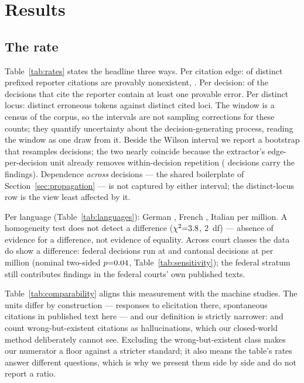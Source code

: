 \documentclass[11pt,a4paper]{article}
\begin{document}
\section{Results}\label{sec:results}

\subsection{The rate}\label{sec:rate}

Table~\ref{tab:rates} states the headline three ways. Per citation
edge: \NFindings{} of \NDenomTokens{} distinct prefixed reporter
citations are provably nonexistent, \RatePpm{}. Per decision:
\DecShare{} of the \NDecTok{} decisions that cite the reporter contain
at least one provable error. Per distinct locus: \NDistinctTokens{}
distinct erroneous tokens against \NDistinctRefs{} distinct cited
loci. The window is a census of the corpus, so the intervals are not
sampling corrections for these counts; they quantify uncertainty about
the decision-generating process, reading the window as one draw from
it. Beside the Wilson interval we report a bootstrap that resamples
decisions; the two nearly coincide because the extractor's
edge-per-decision unit already removes within-decision repetition
(\NDecFind{} decisions carry the \NFindings{} findings). Dependence
\emph{across} decisions --- the shared boilerplate of
Section~\ref{sec:propagation} --- is not captured by either interval;
the distinct-locus row is the view least affected by it.



Per language (Table~\ref{tab:languages}): German \RateDe{}, French
\RateFr{}, Italian \RateIt{} per million. A homogeneity test does not
detect a difference ($\chi^2{=}3.8$, 2~df) --- absence of
evidence for a difference, not evidence of equality. Across court
classes the data do show a difference: federal decisions run at
\RateFederal{} and cantonal decisions at \RateCantonal{} per million
(nominal two-sided $p{=}0.04$, Table~\ref{tab:sensitivity}); the
federal stratum still contributes \NFederalFindings{} findings in the
federal courts' own published texts.





Table~\ref{tab:comparability} aligns this measurement with the machine
studies. The units differ by construction --- responses to elicitation
there, spontaneous citations in published text here --- and our
definition is strictly narrower: \citet{dahl2024} and
\citet{magesh2024} count wrong-but-existent citations as
hallucinations, which our closed-world method deliberately cannot see.
Excluding the wrong-but-existent class makes our numerator a floor
against a stricter standard; it also means the table's rates answer
different questions, which is why we present them side by side and do
not report a ratio.
\end{document}
